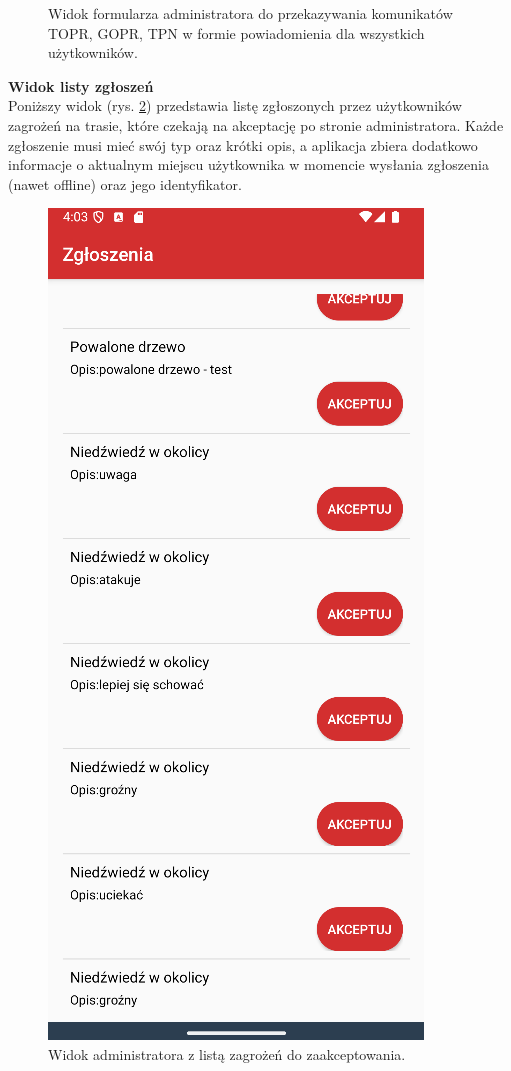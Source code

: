 \begin{figure}[H]
    \caption{Widok formularza administratora do przekazywania komunikatów TOPR, GOPR, TPN w formie powiadomienia dla wszystkich użytkowników.}
    \label{widok:admindanger}
\end{figure}

\noindent
\textbf{Widok listy zgłoszeń}\\
\indent Poniższy widok (rys. \ref{widok:adminaccept}) przedstawia listę zgłoszonych przez użytkowników zagrożeń na trasie, które czekają na akceptację po stronie administratora. Każde zgłoszenie musi mieć swój typ oraz krótki opis, a aplikacja zbiera dodatkowo informacje o aktualnym miejscu użytkownika w momencie wysłania zgłoszenia (nawet offline) oraz jego identyfikator.
\begin{figure}[H]
    \centering
    \includegraphics[scale=0.6]{img/test/testdanger.png}
    \caption{Widok administratora z listą zagrożeń do zaakceptowania.}
    \label{widok:adminaccept}
\end{figure}

